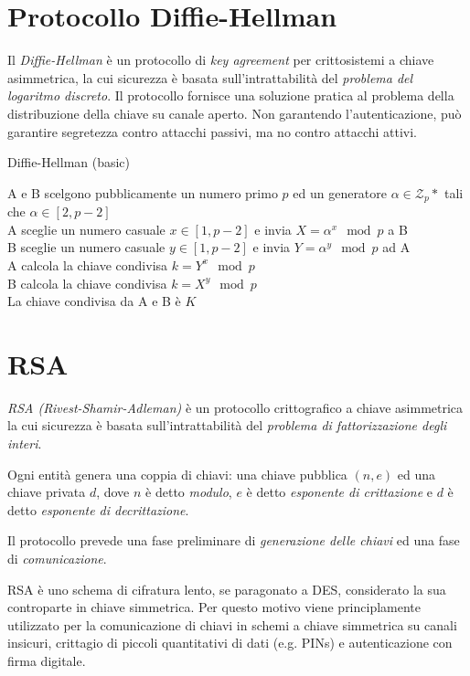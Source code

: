 \section{Protocollo Diffie-Hellman}
Il \textit{Diffie-Hellman} è un protocollo di \textit{key agreement} per crittosistemi a chiave asimmetrica, la cui sicurezza è basata sull'intrattabilità del \textit{problema del logaritmo discreto}.
Il protocollo fornisce una soluzione pratica al problema della distribuzione della chiave su canale aperto.
Non garantendo l'autenticazione, può garantire segretezza contro attacchi passivi, ma no contro attacchi attivi.

\bigskip
\begin{algorithm}[H]
  \caption{Diffie-Hellman (basic)}
  \label{alg:diffie-hellman}
  \SetAlgoNoLine
  A e B scelgono pubblicamente un numero primo $p$ ed un generatore $\alpha\in\mathcal{Z}_{p}*$ tali che $\alpha\in[2,p-2]$ \\
  A sceglie un numero casuale $x\in[1,p-2]$ e invia $X=\alpha^{x}\mod p$ a B \\
  B sceglie un numero casuale $y\in[1,p-2]$ e invia $Y=\alpha^{y}\mod p$ ad A \\
  A calcola la chiave condivisa $k=Y^{x} \mod p$ \\
  B calcola la chiave condivisa $k=X^{y} \mod p$ \\
  La chiave condivisa da A e B è $K$ \\
\end{algorithm}


\section{RSA}
\textit{RSA (Rivest-Shamir-Adleman)} è un protocollo crittografico a chiave asimmetrica la cui sicurezza è basata sull'intrattabilità del \textit{problema di fattorizzazione degli interi}.

Ogni entità genera una coppia di chiavi: una chiave pubblica $(n,e)$ ed una chiave privata $d$, dove $n$ è detto \textit{modulo}, $e$ è detto \textit{esponente di crittazione} e $d$ è detto \textit{esponente di decrittazione}.

Il protocollo prevede una fase preliminare di \textit{generazione delle chiavi} ed una fase di \textit{comunicazione}.

RSA è uno schema di cifratura lento, se paragonato a DES, considerato la sua controparte in chiave simmetrica. Per questo motivo viene principlamente utilizzato per la comunicazione di chiavi in schemi a chiave simmetrica su canali insicuri, crittagio di piccoli quantitativi di dati (e.g. PINs) e autenticazione con firma digitale.

